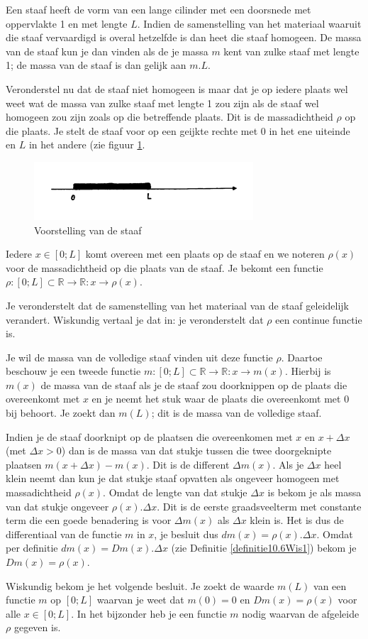 \documentclass{article}
\begin{document}
Een staaf heeft de vorm van een lange cilinder met een doorsnede met oppervlakte 1 en met lengte $L$.
Indien de samenstelling van het materiaal waaruit die staaf vervaardigd is overal hetzelfde is dan heet die staaf homogeen.
De massa van de staaf kun je dan vinden als de je massa $m$ kent van zulke staaf met lengte 1; de massa van de staaf is dan gelijk aan $m.L$.

Veronderstel nu dat de staaf niet homogeen is maar dat je op iedere plaats wel weet wat de massa van zulke staaf met lengte 1 zou zijn als de staaf wel homogeen zou zijn zoals op die betreffende plaats. Dit is de massadichtheid $\rho$ op die plaats.
Je stelt de staaf voor op een geijkte rechte met 0 in het ene uiteinde en $L$ in het andere (zie figuur \ref{figuur11.1Wis1}.
\begin{figure}[h]
\begin{center}
\includegraphics[height=30 mm]{figuur11_1Wis1.pdf}
\caption{Voorstelling van de staaf } \label{figuur11.1Wis1}
\end{center}
\end{figure}
Iedere $x \in [0;L]$ komt overeen met een plaats op de staaf en we noteren $\rho (x)$ voor de massadichtheid op die plaats van de staaf.
Je bekomt een functie $\rho : [0;L] \subset \mathbb{R} \rightarrow \mathbb{R} : x \rightarrow \rho (x)$.

Je veronderstelt dat de samenstelling van het materiaal van de staaf geleidelijk verandert.
Wiskundig vertaal je dat in: je veronderstelt dat $\rho$ een continue functie is.

Je wil de massa van de volledige staaf vinden uit deze functie $\rho$.
Daartoe beschouw je een tweede functie $m : [0;L] \subset \mathbb{R} \rightarrow \mathbb{R} : x \rightarrow m(x)$.
Hierbij is $m(x)$ de massa van de staaf als je de staaf zou doorknippen op de plaats die overeenkomt met $x$ en je neemt het stuk waar de plaats die overeenkomt met 0 bij behoort.
Je zoekt dan $m(L)$; dit is de massa van de volledige staaf.

Indien je de staaf doorknipt op de plaatsen die overeenkomen met $x$ en $x+\Delta x$ (met $\Delta x>0$) dan is de massa van dat stukje tussen die twee doorgeknipte plaatsen $m(x+\Delta x)-m(x)$.
Dit is de different $\Delta m(x)$.
Als je $\Delta x$ heel klein neemt dan kun je dat stukje staaf opvatten als ongeveer homogeen met massadichtheid $\rho (x)$.
Omdat de lengte van dat stukje $\Delta x$ is bekom je als massa van dat stukje ongeveer $\rho (x).\Delta x$.
Dit is de eerste graadsveelterm met constante term die een goede benadering is voor $\Delta m(x)$ als $\Delta x$ klein is.
Het is dus de differentiaal van de functie $m$ in $x$, je besluit dus $dm(x)=\rho (x).\Delta x$.
Omdat per definitie $dm(x)=Dm(x).\Delta x$ (zie Definitie \ref{definitie10.6Wis1}) bekom je $Dm(x)=\rho (x)$.

Wiskundig bekom je het volgende besluit.
Je zoekt de waarde $m(L)$ van een functie $m$ op $[0;L]$ waarvan je weet dat $m(0)=0$ en $Dm(x)=\rho (x)$ voor alle $x \in [0;L]$.
In het bijzonder heb je een functie $m$ nodig waarvan de afgeleide $\rho$ gegeven is.
\end{document}
